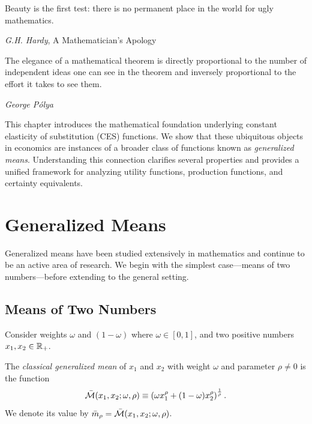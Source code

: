 
\epigraph{Beauty is the first test: there is no permanent place in the world for ugly mathematics.}{\textit{G.H. Hardy}, A Mathematician's Apology}

\epigraph{The elegance of a mathematical theorem is directly proportional to the number of independent ideas one can see in the theorem and inversely proportional to the effort it takes to see them.}{\textit{George Pólya}}

This chapter introduces the mathematical foundation underlying constant elasticity of substitution (CES) functions. We show that these ubiquitous objects in economics are instances of a broader class of functions known as \emph{generalized means}. Understanding this connection clarifies several properties and provides a unified framework for analyzing utility functions, production functions, and certainty equivalents.

\section{Generalized Means}
\label{sec:generalized-means}

Generalized means have been studied extensively in mathematics and continue to be an active area of research. We begin with the simplest case---means of two numbers---before extending to the general setting.

\subsection{Means of Two Numbers}

Consider weights $\omega$ and $(1-\omega)$ where $\omega \in [0,1]$, and two positive numbers $x_1, x_2 \in \mathbb{R}_+$.

\begin{definition}
\label{def:classical-mean}
The \emph{classical generalized mean} of $x_1$ and $x_2$ with weight $\omega$ and parameter $\rho \neq 0$ is the function
\begin{equation}
\label{eq:classical-mean}
\bar{\mathcal{M}}(x_1, x_2; \omega, \rho) \equiv \left( \omega x_1^\rho + (1-\omega) x_2^\rho \right)^{\frac{1}{\rho}}.
\end{equation}
We denote its value by $\bar{m}_\rho = \bar{\mathcal{M}}(x_1, x_2; \omega, \rho)$.
\end{definition}

